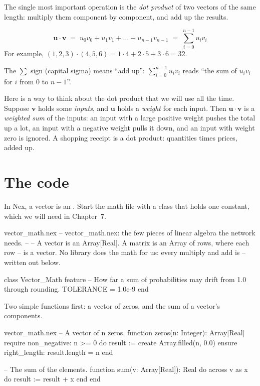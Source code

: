 \documentclass[11pt,a4paper,oneside,openany]{book}
\newcommand{\code}[1]{\texttt{\detokenize{#1}}}
\newcommand{\vect}[1]{\mathbf{#1}}
\begin{document}
The single most important operation is the \emph{dot product} of two
vectors of the same length: multiply them component by component, and add
up the results.

\begin{mathbox}
\[
  \vect{u}\cdot\vect{v} \;=\; u_0 v_0 + u_1 v_1 + \dots + u_{n-1}v_{n-1}
  \;=\; \sum_{i=0}^{n-1} u_i v_i
\]
For example, $(1, 2, 3)\cdot(4, 5, 6) = 1\cdot 4 + 2\cdot 5 + 3\cdot 6 = 32$.
\end{mathbox}

The $\sum$ sign (capital sigma) means ``add up'': $\sum_{i=0}^{n-1} u_i v_i$
reads ``the sum of $u_i v_i$ for $i$ from 0 to $n-1$''.

Here is a way to think about the dot product that we will use all the
time. Suppose $\vect{v}$ holds some \emph{inputs}, and $\vect{u}$ holds a
\emph{weight} for each input. Then $\vect{u}\cdot\vect{v}$ is a
\emph{weighted sum} of the inputs: an input with a large positive weight
pushes the total up a lot, an input with a negative weight pulls it down,
and an input with weight zero is ignored. A shopping receipt is a dot
product: quantities times prices, added up.

\section{The code}

In Nex, a vector is an \code{Array[Real]}. Start the math file with a class
\code{Vector_Math} that holds one constant, which we will need in
Chapter~7.

\begin{newfile}{vector_math.nex}
-- vector_math.nex: the few pieces of linear algebra the network needs.
--
-- A vector is an Array[Real]. A matrix is an Array of rows, where each row
-- is a vector. No library does the math for us: every multiply and add is
-- written out below.

class Vector_Math
feature
  -- How far a sum of probabilities may drift from 1.0 through rounding.
  TOLERANCE = 1.0e-9
end
\end{newfile}

Two simple functions first: a vector of zeros, and the sum of a vector's
components.

\begin{append}{vector_math.nex}
-- A vector of n zeros.
function zeros(n: Integer): Array[Real]
require
  non_negative: n >= 0
do
  result := create Array.filled(n, 0.0)
ensure
  right_length: result.length = n
end

-- The sum of the elements.
function sum(v: Array[Real]): Real do
  across v as x do
    result := result + x
  end
end
\end{append}
\end{document}
